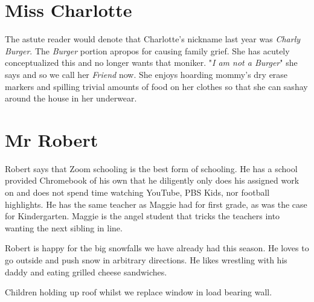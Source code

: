 \documentclass[letterpaper,11pt]{article}
\makeatletter
\newenvironment{figurehere}
  {\def\@captype{figure}}
  {}
\makeatother
\begin{document}
\begin{multicols}{2}
\section{Miss Charlotte}

The astute reader would denote that Charlotte's nickname last year was
\textit{Charly Burger}.  The \textit{Burger} portion apropos for causing
family grief.  She has acutely conceptualized this and no longer wants that
moniker. "\textit{I am not a Burger}" she says and so we call her \textit{Friend}
now.  She enjoys hoarding mommy's dry erase markers and spilling trivial amounts of
food on her clothes so that she can sashay around the house in her underwear. 

\section{Mr Robert}

Robert says that Zoom schooling is the best form of schooling.  He has a school provided Chromebook
of his own that he diligently only does his assigned work on and does not spend
time watching YouTube, PBS Kids, nor football highlights. He has the same teacher as
Maggie had for first grade, as was the case for Kindergarten.  Maggie is the angel
student that tricks the teachers into wanting the next sibling in line.

Robert is happy for the big snowfalls we have already had this season.  He loves
to go outside and push snow in arbitrary directions. He likes wrestling with his
daddy and eating grilled cheese sandwiches.

\bigskip

\begin{figurehere}
    \centering   
    \caption{Children holding up roof whilst we replace window in load bearing wall.}
   \end{figurehere}


\end{multicols}
\end{document}
